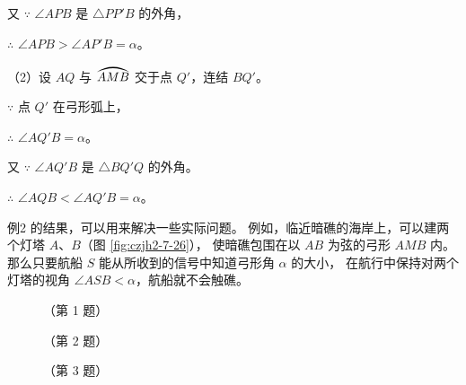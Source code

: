 \begin{enhancedline}
又 $\because$ \quad $\angle APB$ 是 $\triangle PP'B$ 的外角，

$\therefore$ \quad $\angle APB > \angle AP'B = \alpha$。

（2）设 $AQ$ 与 $\yuanhu{AMB}$ 交于点 $Q'$，连结 $BQ'$。

$\because$ \quad 点 $Q'$ 在弓形弧上，

$\therefore$ \quad $\angle AQ'B = \alpha$。

又 $\because$ \quad $\angle AQ'B$ 是 $\triangle BQ'Q$ 的外角。

$\therefore$ \quad $\angle AQB < \angle AQ'B = \alpha$。


例2 的结果，可以用来解决一些实际问题。
例如，临近暗礁的海岸上，可以建两个灯塔 $A$、$B$（图 \ref{fig:czjh2-7-26}），
使暗礁包围在以 $AB$ 为弦的弓形 $AMB$ 内。
那么只要航船 $S$ 能从所收到的信号中知道弓形角 $\alpha$ 的大小，
在航行中保持对两个灯塔的视角 $\angle ASB < \alpha$，航船就不会触礁。


\begin{lianxi}


\begin{figure}[htbp]
    \centering
    \begin{minipage}[b]{4.5cm}
        \centering
        
        \caption*{（第 1 题）}
    \end{minipage}
    \qquad
    \begin{minipage}[b]{4.5cm}
        \centering
        
        \caption*{（第 2 题）}
    \end{minipage}
    \qquad
    \begin{minipage}[b]{4.5cm}
        \centering
        
        \caption*{（第 3 题）}
    \end{minipage}
\end{figure}




\end{lianxi}
\end{enhancedline}

